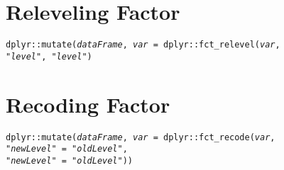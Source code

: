 \documentclass{tufte-handout}
\begin{document}
\vspace{5mm}
\section{Releveling Factor}
\noindent \texttt{dplyr::}{\color{red}\texttt{mutate}}\texttt{(\textit{dataFrame}, \textit{var} = dplyr::}{\color{red}\texttt{fct\_relevel}}\texttt{(\textit{var}, \\ "\textit{level}", "\textit{level}")}

\vspace{5mm}
\section{Recoding Factor}
\noindent \texttt{dplyr::}{\color{red}\texttt{mutate}}\texttt{(\textit{dataFrame}, \textit{var} = dplyr::}{\color{red}\texttt{fct\_recode}}\texttt{(\textit{var}, \\ "\textit{newLevel}" = "\textit{oldLevel}", \\ "\textit{newLevel}" = "\textit{oldLevel}"))}

\end{document}
